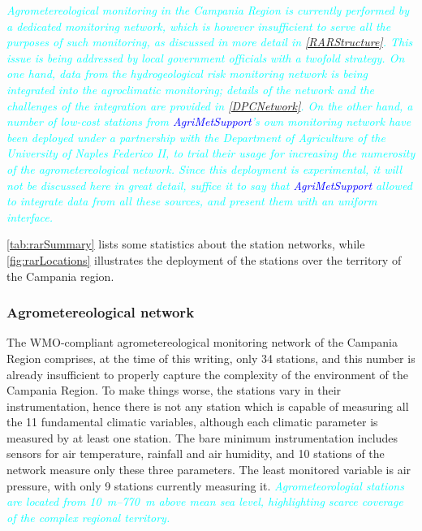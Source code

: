 \documentclass[authoryear,preprint,review,12pt]{elsarticle}
\newcommand{\update}[1]{\emph{\textcolor{blue}{#1}}}
\newcommand{\review}[1]{\emph{\textcolor{cyan}{#1}}}
\newcommand{\gci}{\update{AgriMetSupport}\xspace}
\begin{document}
\review{ Agrometereological monitoring in the Campania Region is currently performed by a dedicated monitoring network, which is however insufficient to serve all the purposes of such monitoring, as discussed in more detail in \cref{RARStructure}. This issue is being addressed by local government officials with a twofold strategy. On one hand, data from the hydrogeological risk monitoring network is being integrated into the agroclimatic monitoring; details of the network and the challenges of the integration are provided in \cref{DPCNetwork}. On the other hand, a number of low-cost stations from \gci's own monitoring network have been deployed under a partnership with the Department of Agriculture of the University of Naples Federico II, to trial their usage for increasing the numerosity of the agrometereological network. Since this deployment is experimental, it will not be discussed here in great detail, suffice it to say that \gci allowed to integrate data from all these sources, and present them with an uniform interface.}

\cref{tab:rarSummary} lists some statistics about the station networks, while \cref{fig:rarLocations} illustrates the deployment of the stations over the territory of the Campania region.

\subsubsection{Agrometereological network\label{RARStructure}}

The WMO-compliant agrometereological monitoring network of the Campania Region comprises, at the time of this writing, only 34 stations, and this number is already insufficient to properly capture the complexity of the environment of the Campania Region.
To make things worse, the stations vary in their instrumentation, hence there is not any station which is capable of measuring all the 11 fundamental climatic variables, although each climatic parameter is measured by at least one station.
The bare minimum instrumentation includes sensors for air temperature, rainfall and air humidity, and 10 stations of the network measure only these three parameters.
The least monitored variable is air pressure, with only 9 stations currently measuring it.
\review{ Agrometeorologial stations are located from \SIrange{10}{770}{\metre} above mean sea level, highlighting scarce coverage of the complex regional territory. }
\end{document}
